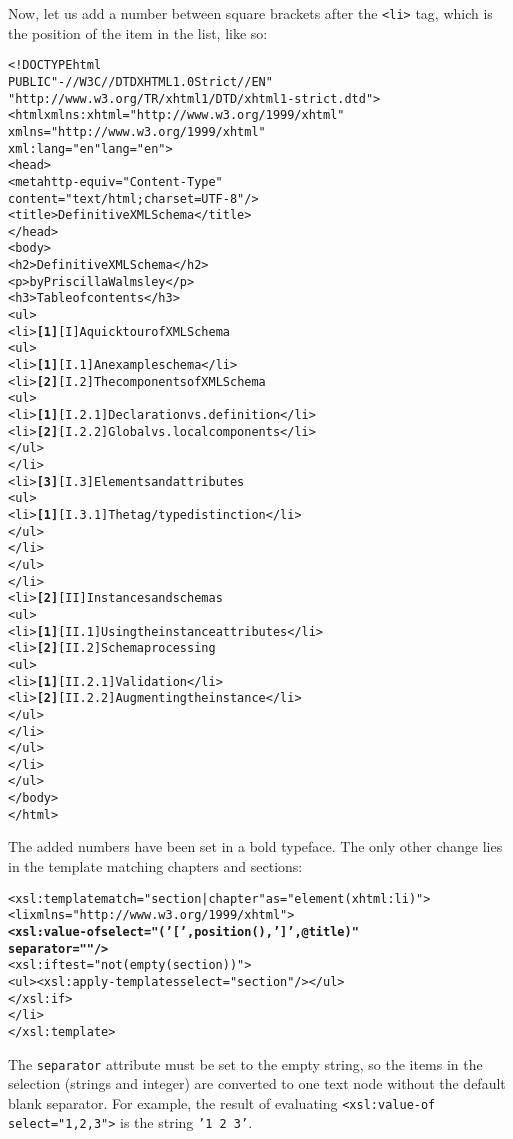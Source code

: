 Now, let us add a number between square brackets after the \XHTML
\texttt{<li>} tag, which is the position of the item in the list, like
so:
\begin{alltt}
<!DOCTYPE html
  PUBLIC "-//W3C//DTD XHTML 1.0 Strict//EN"
         "http://www.w3.org/TR/xhtml1/DTD/xhtml1-strict.dtd">
<html xmlns:xhtml="http://www.w3.org/1999/xhtml"
      xmlns="http://www.w3.org/1999/xhtml"
      xml:lang="en" lang="en">
  <head>
    <meta http-equiv="Content-Type"
          content="text/html; charset=UTF-8"/>
    <title>Definitive XML Schema</title>
  </head>
  <body>
    <h2>Definitive XML Schema</h2>
    <p>by Priscilla Walmsley</p>
    <h3>Table of contents</h3>
    <ul>
      <li>\textbf{[1]} [I] A quick tour of XML Schema
        <ul>
          <li>\textbf{[1]} [I.1] An example schema</li>
          <li>\textbf{[2]} [I.2] The components of XML Schema
            <ul>
              <li>\textbf{[1]} [I.2.1] Declaration vs. definition</li>
              <li>\textbf{[2]} [I.2.2] Global vs. local components</li>
            </ul>
          </li>
          <li>\textbf{[3]} [I.3] Elements and attributes
            <ul>
              <li>\textbf{[1]} [I.3.1] The tag/type distinction</li>
            </ul>
          </li>
        </ul>
      </li>
      <li>\textbf{[2]} [II] Instances and schemas
        <ul>
          <li>\textbf{[1]} [II.1] Using the instance attributes</li>
          <li>\textbf{[2]} [II.2] Schema processing
            <ul>
              <li>\textbf{[1]} [II.2.1] Validation</li>
              <li>\textbf{[2]} [II.2.2] Augmenting the instance</li>
            </ul>
          </li>
        </ul>
      </li>
    </ul>
  </body>
</html>
\end{alltt}
The added numbers have been set in a bold typeface. The only other
change lies in the template matching chapters and sections:
\begin{alltt}
 <xsl:template match="section|chapter" as="element(xhtml:li)">
    <li xmlns="http://www.w3.org/1999/xhtml">
      \textbf{<xsl:value-of select="('[',position(),'] ',@title)"
                    separator=""/>}
      <xsl:if test="not(empty(section))">
        <ul><xsl:apply-templates select="section"/></ul>
      </xsl:if>
    </li>
  </xsl:template>
\end{alltt}
The \texttt{separator} attribute must be set to the empty string, so
the items in the selection (strings and integer) are converted to one
text node without the default blank separator. For example, the result
of evaluating \texttt{<xsl:value-of select="1,2,3">} is the string
\texttt{'1 2 3'}.

